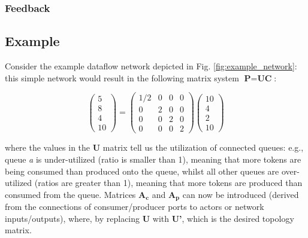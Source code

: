 \subsubsection{Feedback}



\subsection{Example}




Consider the example dataflow network depicted in Fig. \ref{fig:example_network}: this simple network would result in the following matrix system $\textbf{P}=\textbf{U}\textbf{C}$:


\begin{equation}
\begin{pmatrix}
  5  \\
  8  \\
  4  \\
  10
 \end{pmatrix}
=
\begin{pmatrix}
  1/2 & 0 & 0  & 0 \\
  0 & 2 & 0 & 0 \\
  0 & 0 & 2  & 0 \\
  0 & 0 & 0 & 2 
 \end{pmatrix}
 \begin{pmatrix}
  10  \\
  4  \\
  2  \\
  10  
 \end{pmatrix}\end{equation}



where the values in the \textbf{U} matrix tell us the utilization of connected queues: e.g., queue \textit{a} is under-utilized (ratio is smaller than 1), meaning that more tokens are being consumed than produced onto the queue, whilst all other queues are over-utilized (ratios are greater than 1), meaning that more tokens are produced than consumed from the queue. Matrices $\textbf{A}_{\textbf{c}}$ and $\textbf{A}_{\textbf{p}}$ can now be introduced (derived from the connections of consumer/producer ports to actors or network inputs/outputs), where, by replacing \textbf{U} with \textbf{U'}, which is the desired topology matrix.

